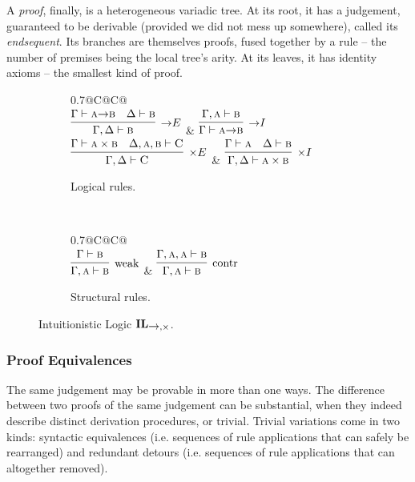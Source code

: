 A \textit{proof}, finally, is a heterogeneous variadic tree.
At its root, it has a judgement, guaranteed to be derivable (provided we did not mess up somewhere), called its \textit{endsequent}.
Its branches are themselves proofs, fused together by a rule -- the number of premises being the local tree's arity.
At its leaves, it has identity axioms -- the smallest kind of proof.

\begin{figure}
	\centering
	\begin{subfigure}{1\textwidth}
		\centering
		\begin{tabularx}{0.7\textwidth}{@{}C@{\qquad}C@{}}
		\\[\smallsep]
		$\infer[\ii E]{\Gamma, \Delta \vdash \prop{b}}{\Gamma \vdash \prop{a} \ii \prop{b} & \Delta \vdash \prop{b}}$ 
		& 
		$\infer[\ii I]{\Gamma \vdash \prop{a} \ii \prop{b}}{\Gamma, \prop{a} \vdash \prop{b}}$\\[\smallsep]
		$\infer[\times E]{\Gamma,\Delta \vdash \prop C}{\Gamma \vdash \prop{a} \times \prop{b} & \Delta, \prop{a} , \prop{b} \vdash \prop C}$ 
		&
		$\infer[\times I]{\Gamma, \Delta \vdash \prop{a} \times \prop{b}}{\Gamma \vdash \prop{a} & \Delta \vdash \prop{b}}$
		\end{tabularx}
		\caption{Logical rules.}
		\label{subfigure:intuitionistic_logic_rules:logical}
	\end{subfigure}\\[\midsep]
	\begin{subfigure}{1\textwidth}
		\centering
		\begin{tabularx}{0.7\textwidth}{@{}C@{\qquad}C@{}}
		\\[\smallsep]
		$\infer[\Weakening{}]{\Gamma, \prop{a} \vdash \prop{b}}{\Gamma \vdash \prop{b}} $ 
		&
		$\infer[\Contraction{}]{\Gamma, \prop{a} \vdash \prop{b}}{\Gamma, \prop{a}, \prop{a} \vdash \prop{b}}$
		\end{tabularx}
		\caption{Structural rules.}
		\label{subfigure:intuitionistic_logic_rules:structural}
	\end{subfigure}
	\caption{Intuitionistic Logic $\IL_{\ii,\times}$.}
	\label{figure:intuitioistic_logic_rules}
\end{figure}

\subsubsection{Proof Equivalences}
The same judgement may be provable in more than one ways.
The difference between two proofs of the same judgement can be substantial, when they indeed describe distinct derivation procedures, or trivial.
Trivial variations come in two kinds: syntactic equivalences (i.e. sequences of rule applications that can safely be rearranged) and redundant detours (i.e. sequences of rule applications that can altogether removed).


